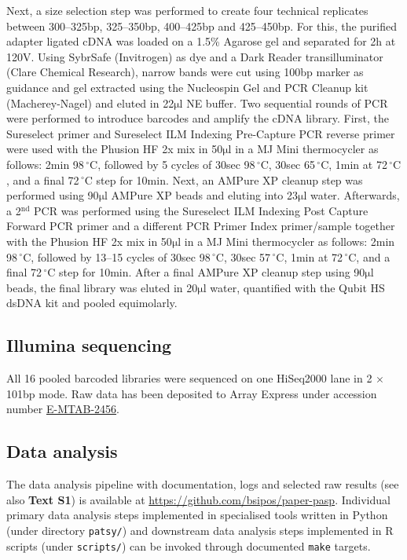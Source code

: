 \documentclass[10pt]{article}
\newcommand{\mul}{\ensuremath{\mathrm{\mu l}}}
\newcommand{\C}{\,$^{\circ}\mathrm{C}$}
\begin{document}
Next, a size selection step was performed to create four technical replicates between 300--325bp, 325--350bp, 400--425bp and 425--450bp. For this, the purified adapter ligated cDNA was loaded on a 1.5\% Agarose gel and separated for 2h at 120V. Using SybrSafe (Invitrogen) as dye and a Dark Reader transilluminator (Clare Chemical Research), narrow bands were cut using 100bp marker as guidance and gel extracted using the Nucleospin Gel and PCR Cleanup kit (Macherey-Nagel) and eluted in 22{\mul} NE buffer.
Two sequential rounds of PCR were performed to introduce barcodes and amplify the cDNA library. First, the Sureselect primer and Sureselect ILM Indexing Pre-Capture PCR reverse primer were used with the Phusion HF 2x mix in 50{\mul} in a MJ Mini thermocycler as follows: 2min 98{\C}, followed by 5 cycles of 30sec 98{\C}, 30sec 65{\C}, 1min at 72{\C}, and a final 72{\C} step for 10min. Next, an AMPure XP cleanup step was performed using 90{\mul} AMPure XP beads and eluting into 23{\mul} water. Afterwards, a 2$^\mathrm{nd}$ PCR was performed using the Sureselect ILM Indexing Post Capture Forward PCR primer and a different PCR Primer Index primer/sample together with the Phusion HF 2x mix in 50{\mul} in a MJ Mini thermocycler as follows: 2min 98{\C}, followed by 13--15 cycles of 30sec 98{\C}, 30sec 57{\C}, 1min at 72{\C}, and a final 72{\C} step for 10min. After a final AMPure XP cleanup step using 90{\mul} beads, the final library was eluted in 20{\mul} water, quantified with the Qubit HS dsDNA kit and pooled equimolarly.

\subsection*{Illumina sequencing}

All 16 pooled barcoded libraries were sequenced on one HiSeq2000 lane in 2 $\times$ 101bp mode. Raw data has been deposited to Array Express under accession number \href{http://www.ebi.ac.uk/arrayexpress/experiments/E-MTAB-2456/}{E-MTAB-2456}.

\subsection*{Data analysis}

The data analysis pipeline with documentation, logs and selected raw results (see also \textbf{Text S1}) is available at \href{https://github.com/bsipos/paper-pasp}{https://github.com/bsipos/paper-pasp}. Individual primary data analysis steps implemented in specialised tools written in Python (under directory \texttt{patsy/})  and downstream data analysis steps implemented in R scripts (under \texttt{scripts/}) can be invoked through documented \texttt{make} targets.
\end{document}
